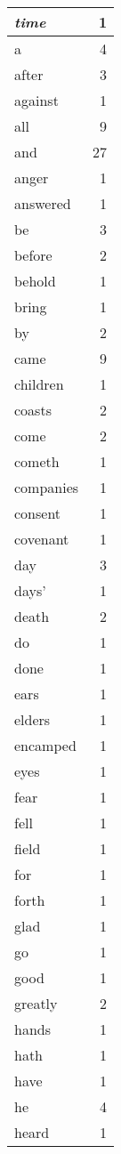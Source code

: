 \begin{center}
\begin{longtable}{l|r}
\emph{time} & 1 \\ \hline
a & 4 \\ \hline
after & 3 \\ \hline
against & 1 \\ \hline
all & 9 \\ \hline
and & 27 \\ \hline
anger & 1 \\ \hline
answered & 1 \\ \hline
be & 3 \\ \hline
before & 2 \\ \hline
behold & 1 \\ \hline
bring & 1 \\ \hline
by & 2 \\ \hline
came & 9 \\ \hline
children & 1 \\ \hline
coasts & 2 \\ \hline
come & 2 \\ \hline
cometh & 1 \\ \hline
companies & 1 \\ \hline
consent & 1 \\ \hline
covenant & 1 \\ \hline
day & 3 \\ \hline
days' & 1 \\ \hline
death & 2 \\ \hline
do & 1 \\ \hline
done & 1 \\ \hline
ears & 1 \\ \hline
elders & 1 \\ \hline
encamped & 1 \\ \hline
eyes & 1 \\ \hline
fear & 1 \\ \hline
fell & 1 \\ \hline
field & 1 \\ \hline
for & 1 \\ \hline
forth & 1 \\ \hline
glad & 1 \\ \hline
go & 1 \\ \hline
good & 1 \\ \hline
greatly & 2 \\ \hline
hands & 1 \\ \hline
hath & 1 \\ \hline
have & 1 \\ \hline
he & 4 \\ \hline
heard & 1 \\ \hline

\end{longtable}
\end{center}
